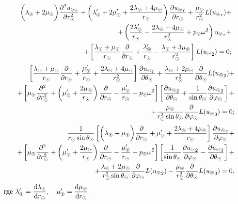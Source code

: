 \begin{equation}\label{eq_1.1}
\begin{split}
\biggl(\la\l+2\mu\l\biggr)\fr{\de^2 {u\l}_r}{\de r\s^2} + \left(\la\l'+2\mu\l'+\fr{2\la\l+4\mu\l}{r\s}\right)\fr{\de {u\l}_r}{\de r\s} + \fr{\mu\l}{r\s^2}L({u\l}_r) +\\
+ \left(\fr{2\la\l'}{r\s} - \fr{2\la\l+4\mu\l}{r\s^2} + p\l\om^2\right){u\l}_r +\\
+ \left[\fr{\la\l+\mu\l}{r\s}\fr{\de}{\de r\s} + \fr{\la\l'}{r\s} - \fr{\la\l+3\mu\l}{r\s^2}\right]L({u\l}_2) = 0;
\end{split}
\end{equation}
\begin{equation}\label{eq_2.1}
\begin{split}
\left[\fr{\la\l+\mu\l}{r\s}\fr{\de}{\de r\s}+\fr{\mu\l'}{r\s}+\fr{2\la\l+4\mu\l}{r\s^2}\right]\fr{\de{u\l}_r}{\de \Q\s} + \fr{\la\l+2\mu\l}{r\s^2}\fr{\de}{\de \Q\s}L({u\l}_2) + \\
+ \left[\mu\l\fr{\de^2}{\de r\s^2} + \left(\mu\l'+\fr{2\mu\l}{r\s}\right)\fr{\de}{\de r\s} - \fr{\mu\l'}{r\s} + p\l\om^2\right]\left[\fr{\de {u\l}_2}{\de\Q\s} + \fr{1}{\sin\Q\s}\fr{\de{u\l}_3}{\de\f\s}\right]+\\
+ \fr{\mu\l}{r\s^2\sin\Q\s}\fr{\de}{\de\f\s}L({u\l}_3) = 0;
\end{split}
\end{equation}
\begin{equation}\label{eq_3.1}
\begin{split}
\fr{1}{r\s\sin\Q\s}\left[\biggl(\la\l+\mu\l\biggr)\fr{\de}{\de r\s} + \mu\l' + \fr{2\la\l+4\mu\l}{r\s}\right]\fr{\de {u\l}_r}{\de\f\s} +\\
+ \left[\mu\l\fr{\de^2}{\de r\s^2} + \left(\mu\l'+\fr{2\mu\l}{r\s}\right)\fr{\de}{\de r\s} - \fr{\mu\l'}{r\s} + p\l\om^2\right]\left[\fr{1}{\sin\Q\s}\fr{\de {u\l}_2}{\de\f\s} - \fr{\de {u\l}_3}{\de\Q\s}\right] +\\
+ \fr{\la\l+2\mu\l}{r\s^2\sin\Q\s}\fr{\de}{\de \f\s}L({u\l}_2) -\fr{\mu\l}{r\s^2}\fr{\de}{\de\Q\s}L({u\l}_3) = 0,
\end{split}
\end{equation}
где $\la\l' = \df{\diff\la\l}{\diff r\s},\q\mu\l' = \df{\diff\mu\l}{\diff r\s}.$

